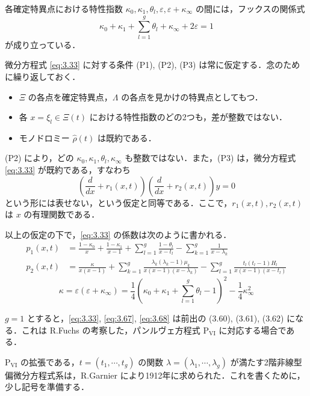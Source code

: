 \begin{story}

各確定特異点における特性指数 $\kappa_0, \kappa_1, \theta_l, \varepsilon, \varepsilon+\kappa_\infty$ の間には，フックスの関係式
\begin{equation}
\kappa_0 + \kappa_1 + \sum_{l=1}^g \theta_l + \kappa_\infty + 2\varepsilon = 1 \label{eq:3.66}
\end{equation}
が成り立っている．

微分方程式 \eqref{eq:3.33} に対する条件 (P1), (P2), (P3) は常に仮定する．念のために繰り返しておく．
\begin{itemize}
    \item[(P1)] $\Xi$ の各点を確定特異点，$\Lambda$ の各点を見かけの特異点としてもつ．
    \item[(P2)] 各 $x = \xi_l \in \Xi(t)$ における特性指数のどの2つも，差が整数ではない．
    \item[(P3)] モノドロミー $\hat{\rho}(t)$ は既約である．
\end{itemize}

(P2) により，どの $\kappa_0, \kappa_1, \theta_l, \kappa_\infty$ も整数ではない．また，(P3) は，微分方程式 \eqref{eq:3.33} が既約である，すなわち
\begin{equation*}
\left( \frac{d}{dx} + r_1(x,t) \right) \left( \frac{d}{dx} + r_2(x,t) \right) y = 0
\end{equation*}
という形には表せない，という仮定と同等である．ここで，$r_1(x,t), r_2(x,t)$ は $x$ の有理関数である．

以上の仮定の下で，\eqref{eq:3.33} の係数は次のように書かれる．
\begin{align}
p_1(x,t) &= \frac{1-\kappa_0}{x} + \frac{1-\kappa_1}{x-1} + \sum_{l=1}^g \frac{1-\theta_l}{x-t_l} - \sum_{k=1}^g \frac{1}{x-\lambda_k} \label{eq:3.67} \\
p_2(x,t) &= \frac{\kappa}{x(x-1)} + \sum_{k=1}^g \frac{\lambda_k(\lambda_k-1)\mu_k}{x(x-1)(x-\lambda_k)} - \sum_{l=1}^g \frac{t_l(t_l-1)H_l}{x(x-1)(x-t_l)} \label{eq:3.68}
\end{align}
\begin{equation*}
\kappa = \varepsilon(\varepsilon+\kappa_\infty) = \frac{1}{4} \left( \kappa_0 + \kappa_1 + \sum_{l=1}^g \theta_l - 1 \right)^2 - \frac{1}{4}\kappa_\infty^2
\end{equation*}

$g=1$ とすると，\eqref{eq:3.33}, \eqref{eq:3.67}, \eqref{eq:3.68} は前出の (3.60), (3.61), (3.62) になる．これは R.Fuchs の考察した，パンルヴェ方程式 $\mathrm{P_{VI}}$ に対応する場合である．

$\mathrm{P_{VI}}$ の拡張である，$t=(t_1, \cdots, t_g)$ の関数 $\lambda=(\lambda_1, \cdots, \lambda_g)$ が満たす2階非線型偏微分方程式系は，R.Garnier により1912年に求められた．これを書くために，少し記号を準備する．

\end{story}

